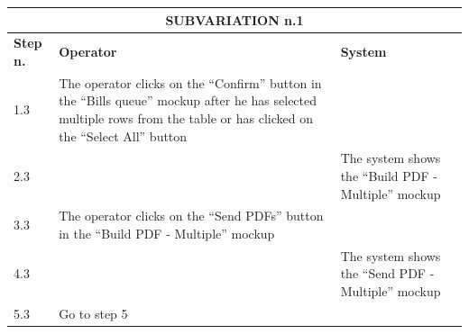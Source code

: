 {{{\begin{center}
			\begin{tabular}{|p{2cm}|p{6cm}|p{6cm}|}
			\hline
				\multicolumn{3}{|c|}{SUBVARIATION n.1}\\
			\hline
				\centering \vspace{1mm} \bfseries{Step n.} \vspace{1mm} & \vspace{1mm} \bfseries{Operator} \vspace{1mm} & \vspace{1mm} \bfseries{System} \vspace{1mm}\\
			\hline
				\vspace{1mm} 1.3\vspace{1mm} &
				\vspace{1mm} The operator clicks on the “Confirm” button in the “Bills queue” mockup after he has selected multiple rows from the table or has clicked on the “Select All” button\vspace{1mm} & 
				\vspace{1mm} \vspace{1mm} \\
			\hline
				\vspace{1mm} 2.3\vspace{1mm} &
				\vspace{1mm} \vspace{1mm} & 
				\vspace{1mm} The system shows the “Build PDF - Multiple” mockup \vspace{1mm} \\
			\hline
				\vspace{1mm} 3.3\vspace{1mm} &
				\vspace{1mm} The operator clicks on the “Send PDFs” button in the “Build PDF - Multiple” mockup \vspace{1mm} & 
				\vspace{1mm} \vspace{1mm} \\
			\hline
				\vspace{1mm} 4.3\vspace{1mm} &
				\vspace{1mm} \vspace{1mm} & 
				\vspace{1mm} The system shows the “Send PDF - Multiple” mockup\vspace{1mm} \\
			\hline
				\vspace{1mm} 5.3\vspace{1mm} &
				\vspace{1mm} Go to step 5\vspace{1mm} & 
				\vspace{1mm} \vspace{1mm} \\
			\hline
			\end{tabular}
			\end{center}
			
}}}
